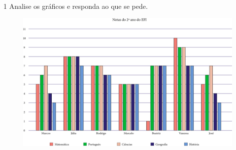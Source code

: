 \num{1} Analise os gráficos e responda ao que se pede.

\begin{figure}[htpb!]
\centering
\includegraphics[width=.9\textwidth]{./media/image90.png}
\end{figure}

